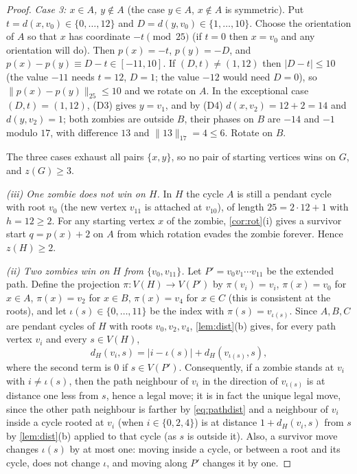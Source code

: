 \documentclass[11pt,a4paper]{article}
\theoremstyle{plain}
\theoremstyle{definition}
\theoremstyle{remark}
\newcommand{\cyc}[2]{\lVert #1\rVert_{#2}}
\newcommand{\dist}{d}
\newcommand{\proj}{\pi}
\newcommand{\idx}{\iota}
\begin{document}
\begin{proof}
\emph{Case 3: $x\in A$, $y\notin A$} (the case $y\in A$, $x\notin A$ is symmetric). Put $t=\dist(x,v_0)\in\{0,\dots,12\}$ and $D=\dist(y,v_0)\in\{1,\dots,10\}$. Choose the orientation of $A$ so that $x$ has coordinate $-t\pmod{25}$ (if $t=0$ then $x=v_0$ and any orientation will do). Then $p(x)=-t$, $p(y)=-D$, and $p(x)-p(y)\equiv D-t\in[-11,10]$. If $(D,t)\ne(1,12)$ then $|D-t|\le10$ (the value $-11$ needs $t=12$, $D=1$; the value $-12$ would need $D=0$), so $\cyc{p(x)-p(y)}{25}\le10$ and we rotate on $A$. In the exceptional case $(D,t)=(1,12)$, (D3) gives $y=v_1$, and by (D4) $\dist(x,v_2)=12+2=14$ and $\dist(y,v_2)=1$; both zombies are outside $B$, their phases on $B$ are $-14$ and $-1$ modulo $17$, with difference $13$ and $\cyc{13}{17}=4\le6$. Rotate on $B$.

The three cases exhaust all pairs $\{x,y\}$, so no pair of starting vertices wins on $G$, and $z(G)\ge3$.

\emph{(iii) One zombie does not win on $H$.} In $H$ the cycle $A$ is still a pendant cycle with root $v_0$ (the new vertex $v_{11}$ is attached at $v_{10}$), of length $25=2\cdot12+1$ with $h=12\ge2$. For any starting vertex $x$ of the zombie, \cref{cor:rot}(i) gives a survivor start $q=p(x)+2$ on $A$ from which rotation evades the zombie forever. Hence $z(H)\ge2$.

\emph{(ii) Two zombies win on $H$ from $\{v_0,v_{11}\}$.} Let $P'=v_0v_1\cdots v_{11}$ be the extended path. Define the projection $\proj:V(H)\to V(P')$ by $\proj(v_i)=v_i$, $\proj(x)=v_0$ for $x\in A$, $\proj(x)=v_2$ for $x\in B$, $\proj(x)=v_4$ for $x\in C$ (this is consistent at the roots), and let $\idx(s)\in\{0,\dots,11\}$ be the index with $\proj(s)=v_{\idx(s)}$. Since $A,B,C$ are pendant cycles of $H$ with roots $v_0,v_2,v_4$, \cref{lem:dist}(b) gives, for every path vertex $v_i$ and every $s\in V(H)$,
\begin{equation}\label{eq:pathdist}
\dist_H(v_i,s)=|i-\idx(s)|+\dist_H(v_{\idx(s)},s),
\end{equation}
where the second term is $0$ if $s\in V(P')$. Consequently, if a zombie stands at $v_i$ with $i\ne\idx(s)$, then the path neighbour of $v_i$ in the direction of $v_{\idx(s)}$ is at distance one less from $s$, hence a legal move; it is in fact the unique legal move, since the other path neighbour is farther by \eqref{eq:pathdist} and a neighbour of $v_i$ inside a cycle rooted at $v_i$ (when $i\in\{0,2,4\}$) is at distance $1+\dist_H(v_i,s)$ from $s$ by \cref{lem:dist}(b) applied to that cycle (as $s$ is outside it). Also, a survivor move changes $\idx(s)$ by at most one: moving inside a cycle, or between a root and its cycle, does not change $\idx$, and moving along $P'$ changes it by one.


\end{proof}
\end{document}
